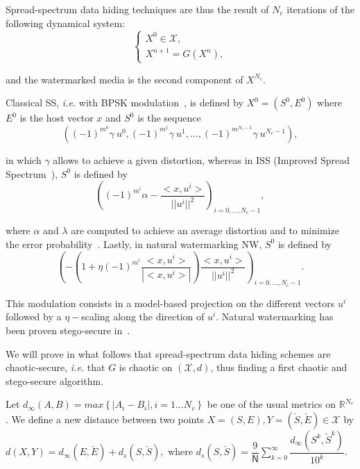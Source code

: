 \documentclass{llncs}
\begin{document}
Spread-spectrum data hiding techniques are thus the result of $N_c$ iterations of the following dynamical system:
\begin{equation}
\left\{
\begin{array}{l}
X^0 \in \mathcal{X},\\
X^{n+1} = G(X^n),
\end{array}
\right.
\end{equation}

\noindent and the watermarked media is the second component of $X^{N_c}$.

Classical SS, \emph{i.e.} with BPSK modulation~\cite{Cayre2008}, is defined by $X^0 = (S^0, E^0)$ where $E^0$ is the host vector $x$ and $S^0$ is the sequence 
\begin{equation}
\left((-1)^{m^0} \gamma ~u^0, (-1)^{m^1} \gamma ~u^1, \hdots, (-1)^{m^{N_c-1}} \gamma ~u^{N_c-1} \right),
\end{equation}

\noindent in which $\gamma$ allows to achieve a given distortion, whereas in ISS (Improved Spread Spectrum~\cite{Malvar03}), $S^0$ is defined by
\begin{equation}
\left( (-1)^{m^i} \alpha  - \dfrac{<x,u^i>}{||u^i||^2} \right)_{i=0, \hdots, N_c-1},
\end{equation}

\noindent where $\alpha$ and $\lambda$ are computed to achieve an average distortion and to minimize the error probability~\cite{Cayre2008}. Lastly, in natural watermarking NW, $S^0$ is defined by
\begin{equation}
\left(- \left( 1 + \eta (-1)^{m^i} \dfrac{<x,u^i>}{|<x,u^i>|} \right) \dfrac{<x,u^i>}{||u^i||^2}
\right)_{i=0, \hdots, N_c-1}.
\end{equation}

This modulation consists in a model-based projection on the different vectors $u^i$ followed by a $\eta-$scaling along the direction of $u^i$. Natural watermarking has been proven stego-secure in~\cite{Cayre2008}.

\bigskip

We will prove in what follows that spread-spectrum data hiding schemes are chaotic-secure, \emph{i.e.} that $G$ is chaotic on $(\mathcal{X},d)$, thus finding a first chaotic and stego-secure algorithm.


Let $d_{\infty}(A,B) = max\left\{ |A_i-B_i|, i=1\hdots N_v\right\}$ be one of the usual metrics on $\mathds{R}^{N_v}$. We define a new distance between two points $X = (S,E), Y = (\check{S},\check{E})\in
\mathcal{X}$ by $d(X,Y)=d_{\infty}(E,\check{E})+d_s(S,\check{S}),$ where $\displaystyle{d_s(S,\check{S})} = \displaystyle{\dfrac{9}{\mathsf{N}}\sum_{k=0}^{\infty }\dfrac{d_{\infty}(S^k, \check{S}^k)}{10^{k}}}.$
\end{document}
